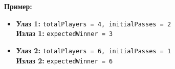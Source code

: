 \textbf{Пример:}
\begin{itemize}
	\item \textbf{Улаз 1:} \texttt{totalPlayers = 4, initialPasses = 2} \\
	      \textbf{Излаз 1:} \texttt{expectedWinner = 3}
	\item \textbf{Улаз 2:} \texttt{totalPlayers = 6, initialPasses = 1} \\
	      \textbf{Излаз 2:} \texttt{expectedWinner = 6}
\end{itemize}

